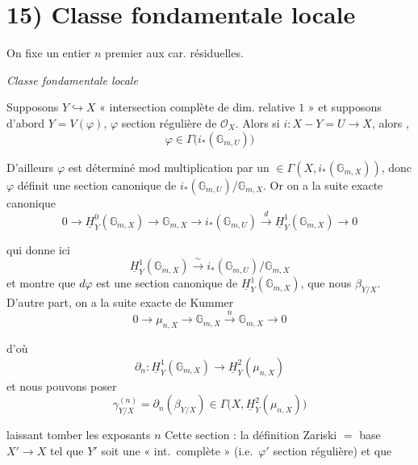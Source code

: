 \documentclass[11pt,a4paper]{article}
\begin{document}
\section{15) Classe fondamentale locale}


On fixe un entier $n$ premier aux car. résiduelles.

\emph{Classe fondamentale locale}

Supposons $Y \hookrightarrow X$ « intersection complète de dim. relative $1$ » et supposons d'abord
$Y = V(\varphi)$, $\varphi$ section régulière de $\mathcal{O}_X$. Alors si
$i : X - Y = U \to X$, alors , 
\[
  \varphi \in \Gamma\bigl(i_*(\mathbb{G}_{m,U})\bigr)
\]

 D'ailleurs $\varphi$ est déterminé mod multiplication par un \struck{\ill{}}
$\in \Gamma(X, i_*(\mathbb{G}_{m,X}))$, donc $\varphi$ définit une section \struck{\ill{}} canonique de
 $i_*(\mathbb{G}_{m,U})/\mathbb{G}_{m,X}$. Or on a la suite exacte canonique
\[
  0 \to \underline{H}^0_Y(\mathbb{G}_{m,X}) \to \mathbb{G}_{m,X} \to i_*(\mathbb{G}_{m,U})
  \xrightarrow{\ d\ } \underline{H}^1_Y(\mathbb{G}_{m,X}) \to 0
\]

qui donne ici \struck{\ill{}}
\[
  \underline{H}^1_Y(\mathbb{G}_{m,X}) \xrightarrow{\ \sim\ } i_*(\mathbb{G}_{m,U})/\mathbb{G}_{m,X}
\]
et montre que $d\varphi$ est une section canonique de $\underline{H}^1_Y(\mathbb{G}_{m,X})$, que nous
 \struck{\ill{}} $\beta_{Y/X}$. D'autre part, on a la suite exacte de Kummer
\[
  0 \to \mu_{n,X} \to \mathbb{G}_{m,X} \xrightarrow{\ n\ } \mathbb{G}_{m,X} \to 0
\]

d'où
\[
  \partial_n : \underline{H}^1_Y(\mathbb{G}_{m,X}) \longrightarrow \underline{H}^2_Y(\mu_{n,X})
\]
et nous pouvons \struck{\ill{}} poser
\[
  \gamma^{(n)}_{Y/X} = \partial_n(\beta_{Y/X}) \in \Gamma\bigl(X, \underline{H}^2_Y(\mu_{n,X})\bigr)
\]

 laissant tomber les exposants $n$ \ill{} \ill{} \ill{} \ill{} \ill{}
 Cette section  \ill{} \ill{} : la définition
 Zariski \ill{} $=$ \ill{} \ill{} \ill{} base \ill{}
$X' \to X$ tel que $Y'$ soit une « int.\ complète » (i.e.\ $\varphi'$ section régulière) et que \ill{} \ill{}
\end{document}
